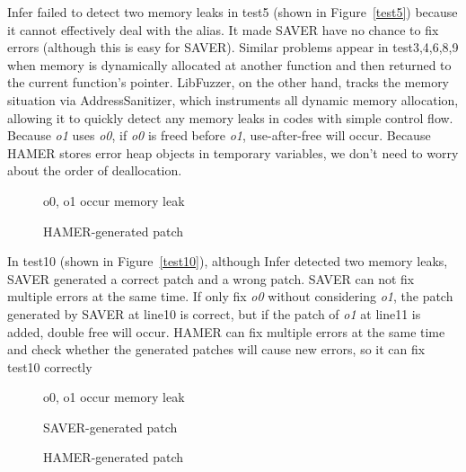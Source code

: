\documentclass[a4paper,11pt,oneside,openany]{book}
\begin{document}
Infer failed to detect two memory leaks in test5 (shown in Figure~\ref{test5}) because it cannot effectively deal with the alias. It made SAVER have no chance to fix errors (although this is easy for SAVER). Similar problems appear in test3,4,6,8,9 when memory is dynamically allocated at another function and then returned to the current function's pointer. LibFuzzer, on the other hand, tracks the memory situation via AddressSanitizer, which instruments all dynamic memory allocation, allowing it to quickly detect any memory leaks in codes with simple control flow. Because {\it o1} uses {\it o0}, if {\it o0} is freed before {\it o1}, use-after-free will occur. Because HAMER stores error heap objects in temporary variables, we don't need to worry about the order of deallocation.

\begin{figure*}[h]
  \begin{subfigure}{0.53\textwidth}
    
    \caption{o0, o1 occur memory leak}
    \label{test5a}
  \end{subfigure}\hfill
  \begin{subfigure}{0.4\textwidth}
    
    \caption{HAMER-generated patch}
    \label{test5b}
  \end{subfigure}
  \caption{test5} 
  \label{test5}
\end{figure*}

In test10 (shown in Figure~\ref{test10}), although Infer detected two memory leaks, SAVER generated a correct patch and a wrong patch. SAVER can not fix multiple errors at the same time. If only fix {\it o0} without considering {\it o1}, the patch generated by SAVER at line10 is correct, but if the patch of {\it o1} at line11 is added, double free will occur. HAMER can fix multiple errors at the same time and check whether the generated patches will cause new errors, so it can fix test10 correctly

\begin{figure*}[t]
  \begin{subfigure}{0.45\textwidth}
    
    \caption{o0, o1 occur memory leak}
    \label{test10a}
  \end{subfigure}\hfill
  \begin{subfigure}{0.45\textwidth}
    
    \caption{SAVER-generated patch}
    \label{test10b}
  \end{subfigure}
  \centering
  \begin{subfigure}{0.45\textwidth}
    
    \caption{HAMER-generated patch}
    \label{test10c}
  \end{subfigure}
  \caption{test10} 
  \label{test10}
\end{figure*}
\end{document}
